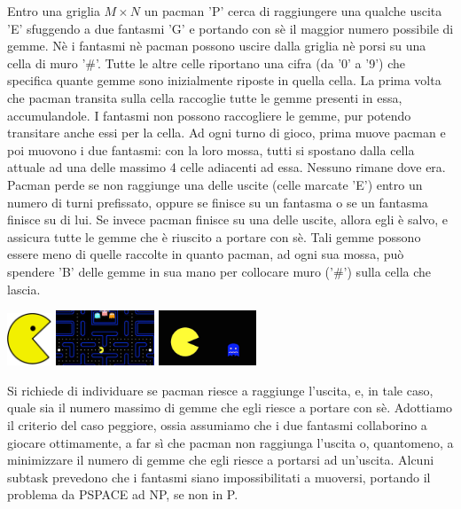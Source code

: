 \renewcommand{\nomebreve}{pacman\_game}
\renewcommand{\titolo}{Un pacman contro due fantasmi}

\introduzione{}
\vspace{-1cm}

Entro una griglia $M\times N$ un pacman 'P' cerca di raggiungere una qualche uscita 'E' sfuggendo a due fantasmi 'G' e portando con sè il maggior numero possibile di gemme. Nè i fantasmi nè pacman possono uscire dalla griglia nè porsi su una cella di muro '\#'.
Tutte le altre celle riportano una cifra (da '0' a '9') che specifica quante gemme sono inizialmente riposte in quella cella. La prima volta che pacman transita sulla cella raccoglie tutte le gemme presenti in essa, accumulandole. I fantasmi non possono raccogliere le gemme, pur potendo transitare anche essi per la cella. Ad ogni turno di gioco, prima muove pacman e poi muovono i due fantasmi: con la loro mossa, tutti si spostano dalla cella attuale ad una delle massimo 4 celle adiacenti ad essa. Nessuno rimane dove era. Pacman perde se non raggiunge una delle uscite (celle marcate 'E') entro un numero di turni prefissato, oppure se finisce su un fantasma o se un fantasma finisce su di lui. Se invece pacman finisce su una delle uscite, allora egli è salvo, e assicura tutte le gemme che è riuscito a portare con sè. Tali gemme possono essere meno di quelle raccolte in quanto pacman, ad ogni sua mossa, può spendere 'B' delle gemme in sua mano per collocare muro ('\#') sulla cella che lascia.


\hspace{0.8cm}
\includegraphics[width=0.1\textwidth]{figures/pacman_big.png}
\hfill
\includegraphics[width=0.22\textwidth]{figures/pacman_field.jpeg}
\hfill
\includegraphics[width=0.22\textwidth]{figures/pacman_rage.png}

Si richiede di individuare se pacman riesce a raggiunge l'uscita, e, in tale caso, quale sia il numero massimo di gemme che egli riesce a portare con sè.
Adottiamo il criterio del caso peggiore, ossia assumiamo che i due fantasmi collaborino a giocare ottimamente, a far sì che pacman non raggiunga l'uscita o, quantomeno, a minimizzare il numero di gemme che egli riesce a portarsi ad un'uscita.
Alcuni subtask prevedono che i fantasmi siano impossibilitati a muoversi, portando il problema da PSPACE ad NP, se non in P.

